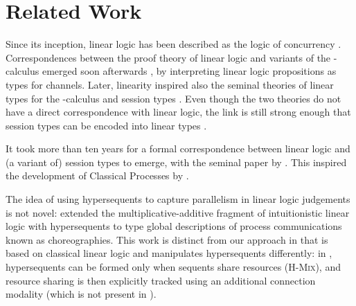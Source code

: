 \documentclass[draft,submission,copyright,creativecommons]{eptcs}
\begin{document}
\section{Related Work}
\label{sec:related-work}

Since its inception, linear logic has been described as the logic of
concurrency \cite{girard1987}.
Correspondences between the proof theory of linear logic and variants of the
\textpi-calculus emerged soon afterwards \cite{abramsky1994,bellin1994}, by
interpreting linear logic propositions as types for channels.
Later, linearity inspired also the seminal theories of linear types for the
\textpi-calculus \cite{kobayashi1999} and session types \cite{honda1998}.
Even though the two theories do not have a direct correspondence with linear
logic, the link is still strong enough that session types
can be encoded into linear types \cite{dardha2017}.

It took more than ten years for a formal correspondence between linear logic and
(a variant of) session types to emerge, with the seminal paper by \citet{caires2010}.
This inspired the development of Classical Processes by \citet{wadler2012}.

The idea of using hypersequents to capture parallelism in linear logic judgements is not
novel: \citet{carbone2018} extended the multiplicative-additive fragment
of intuitionistic linear logic with hypersequents to type global descriptions of
process communications known as choreographies.
This work is distinct from our approach in that \hcp is based on classical linear
logic and manipulates hypersequents differently: in \citet{carbone2018}, hypersequents can be formed only when sequents share
resources (\cf \textsc{H-Mix}), and resource sharing is then explicitly tracked
using an additional connection modality (which is not present in \hcp).


\clearpage


\end{document}
